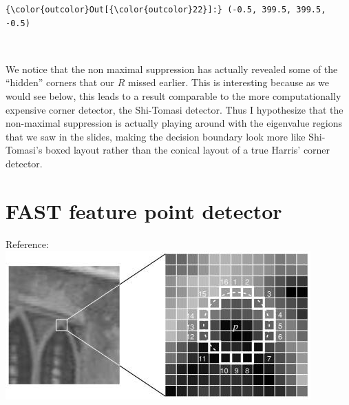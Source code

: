 \documentclass[11pt]{article}
\makeatletter
\def\maxwidth{\ifdim\Gin@nat@width>\linewidth\linewidth
    \else\Gin@nat@width\fi}
\let\Oldincludegraphics\includegraphics
\renewcommand{\includegraphics}[1]{\Oldincludegraphics[width=.8\maxwidth]{#1}}
\makeatother
\begin{document}
\begin{Verbatim}[commandchars=\\\{\}]
{\color{outcolor}Out[{\color{outcolor}22}]:} (-0.5, 399.5, 399.5, -0.5)
\end{Verbatim}
            
    \begin{center}
    \end{center}
    { \hspace*{\fill} \\}
    
    We notice that the non maximal suppression has actually revealed some of
the ``hidden'' corners that our \(R\) missed earlier. This is
interesting because as we would see below, this leads to a result
comparable to the more computationally expensive corner detector, the
Shi-Tomasi detector. Thus I hypothesize that the non-maximal suppression
is actually playing around with the eigenvalue regions that we saw in
the slides, making the decision boundary look more like Shi-Tomasi's
boxed layout rather than the conical layout of a true Harris' corner
detector.

    \hypertarget{fast-feature-point-detector}{%
\section{FAST feature point
detector}\label{fast-feature-point-detector}}

    Reference:
\includegraphics{fast_speedtest.jpg}
\end{document}
